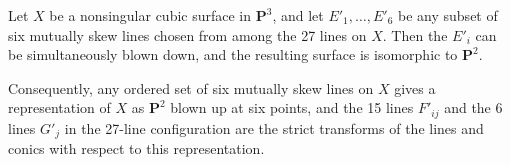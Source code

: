 Let $X$ be a nonsingular cubic surface in $\mathbf{P}^3$, and let $E'_1, \ldots, E'_6$ be any subset of six mutually skew lines chosen from among the 27 lines on $X$. Then the $E'_i$ can be simultaneously blown down, and the resulting surface is isomorphic to $\mathbf{P}^2$.

Consequently, any ordered set of six mutually skew lines on $X$ gives a representation of $X$ as $\mathbf{P}^2$ blown up at six points, and the 15 lines $F'_{ij}$ and the 6 lines $G'_j$ in the 27-line configuration are the strict transforms of the lines and conics with respect to this representation.
